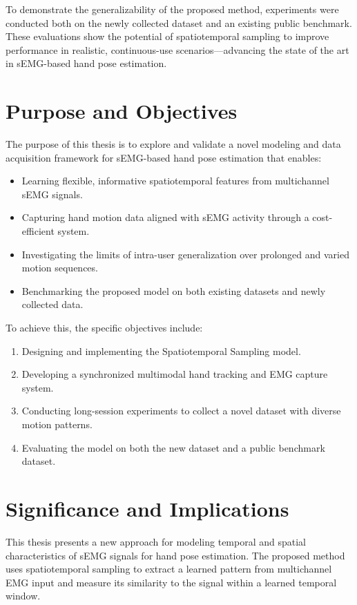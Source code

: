To demonstrate the generalizability of the proposed method, experiments were conducted both on the newly collected dataset and an existing public benchmark. These evaluations show the potential of spatiotemporal sampling to improve performance in realistic, continuous-use scenarios—advancing the state of the art in sEMG-based hand pose estimation.

\section{Purpose and Objectives}

The purpose of this thesis is to explore and validate a novel modeling and data acquisition framework for sEMG-based hand pose estimation that enables:
\begin{itemize}
    \item Learning flexible, informative spatiotemporal features from multichannel sEMG signals.
    \item Capturing hand motion data aligned with sEMG activity through a cost-efficient system.
    \item Investigating the limits of intra-user generalization over prolonged and varied motion sequences.
    \item Benchmarking the proposed model on both existing datasets and newly collected data.
\end{itemize}

To achieve this, the specific objectives include:
\begin{enumerate}
    \item Designing and implementing the Spatiotemporal Sampling model.
    \item Developing a synchronized multimodal hand tracking and EMG capture system.
    \item Conducting long-session experiments to collect a novel dataset with diverse motion patterns.
    \item Evaluating the model on both the new dataset and a public benchmark dataset.
\end{enumerate}

\section{Significance and Implications}

This thesis presents a new approach for modeling temporal and spatial characteristics of sEMG signals for hand pose estimation. The proposed method uses spatiotemporal sampling to extract a learned pattern from multichannel EMG input and measure its similarity to the signal within a learned temporal window.

